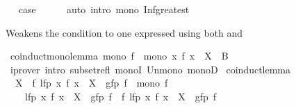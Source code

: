 \begin{isabellebody}
\ \isamarkupfalse%
\ {\isacharquery}{\kern0pt}case\isanewline
\ \ \ \ \isamarkupfalse%
\ {\isacharparenleft}{\kern0pt}auto\ intro{\isacharcolon}{\kern0pt}\ mono\ Inf{\isacharunderscore}{\kern0pt}greatest{\isacharparenright}{\kern0pt}\isanewline
{}\isamarkupfalse%
%
\endisatagproof
{\isafoldproof}%
%
\isadelimproof
%
\endisadelimproof
%
\isadelimdocument
%
\endisadelimdocument
%
\isatagdocument
%
\isamarkuptrue%
%
\endisatagdocument
{\isafolddocument}%
%
\isadelimdocument
%
\endisadelimdocument
%
\begin{isamarkuptext}%
Weakens the condition  to one expressed using both
   and %
\end{isamarkuptext}\isamarkuptrue%
\isamarkupfalse%
\ coinduct{}{\isacharunderscore}{\kern0pt}mono{\isacharunderscore}{\kern0pt}lemma{\isacharcolon}{\kern0pt}\ {\isachardoublequoteopen}mono\ f\ {\isasymLongrightarrow}\ mono\ {\isacharparenleft}{\kern0pt}{\isasymlambda}x{\isachardot}{\kern0pt}\ f\ x\ {\isasymunion}\ X\ {\isasymunion}\ B{\isacharparenright}{\kern0pt}{\isachardoublequoteclose}\isanewline
%
\isadelimproof
\ \ %
\endisadelimproof
%
\isatagproof
{}\isamarkupfalse%
\ {\isacharparenleft}{\kern0pt}iprover\ intro{\isacharcolon}{\kern0pt}\ subset{\isacharunderscore}{\kern0pt}refl\ monoI\ Un{\isacharunderscore}{\kern0pt}mono\ monoD{\isacharparenright}{\kern0pt}%
\endisatagproof
{\isafoldproof}%
%
\isadelimproof
\isanewline
%
\endisadelimproof
\isanewline
{}\isamarkupfalse%
\ coinduct{}{\isacharunderscore}{\kern0pt}lemma{\isacharcolon}{\kern0pt}\isanewline
\ \ {\isachardoublequoteopen}X\ {\isasymsubseteq}\ f\ {\isacharparenleft}{\kern0pt}lfp\ {\isacharparenleft}{\kern0pt}{\isasymlambda}x{\isachardot}{\kern0pt}\ f\ x\ {\isasymunion}\ X\ {\isasymunion}\ gfp\ f{\isacharparenright}{\kern0pt}{\isacharparenright}{\kern0pt}\ {\isasymLongrightarrow}\ mono\ f\ {\isasymLongrightarrow}\isanewline
\ \ \ \ lfp\ {\isacharparenleft}{\kern0pt}{\isasymlambda}x{\isachardot}{\kern0pt}\ f\ x\ {\isasymunion}\ X\ {\isasymunion}\ gfp\ f{\isacharparenright}{\kern0pt}\ {\isasymsubseteq}\ f\ {\isacharparenleft}{\kern0pt}lfp\ {\isacharparenleft}{\kern0pt}{\isasymlambda}x{\isachardot}{\kern0pt}\ f\ x\ {\isasymunion}\ X\ {\isasymunion}\ gfp\ f{\isacharparenright}{\kern0pt}{\isacharparenright}{\kern0pt}{\isachardoublequoteclose}\isanewline
%
\isadelimproof
\ \ %
\endisadelimproof
%
\isatagproof

\end{isabellebody}
